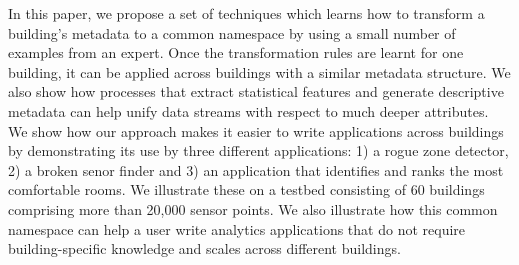 
In this paper, we propose a set of techniques which learns how to transform a 
building's metadata 
to a common namespace by using a small number of examples from an expert. Once the transformation 
rules are learnt for one building, it can be applied across buildings with a similar 
metadata structure.  We also show how processes that extract statistical features and generate
descriptive metadata can help unify data streams with respect to much deeper attributes.
We show how our approach makes it easier to write applications across buildings by
demonstrating its use by three different applications: 1) a rogue zone detector, 2)
a broken senor finder and 3) an application that identifies and ranks the most comfortable
rooms. We illustrate these on a testbed consisting of 60 buildings comprising more 
than 20,000 sensor points. We also illustrate how this common namespace can help a user write 
analytics applications that do not require building-specific knowledge and scales across 
different buildings. 



 
